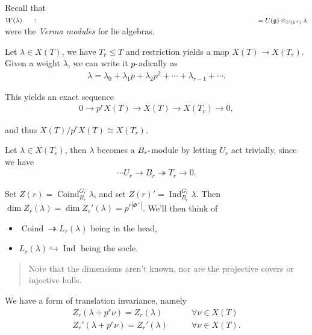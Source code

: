 Recall that
\(W(\lambda) \mathrel{\vcenter{:}}= U({\mathfrak{g}}) \otimes_{U({\mathfrak{b}}^+)} \lambda\)
were the \emph{Verma modules} for lie algebras.

Let \(\lambda \in X(T)\), we have \(T_r \leq T\) and restriction yields
a map \(X(T) \to X(T_r)\). Given a weight \(\lambda\), we can write it
\(p{\hbox{-}}\)adically as
\begin{align*}   \lambda = \lambda_0 + \lambda_1 p + \lambda_2 p^2 + \cdots + \lambda_{r-1} + \cdots .\end{align*}

This yields an exact sequence
\begin{align*}   0 \to p^r X(T) \to X(T) \to X(T_r) \to 0 ,\end{align*}

and thus \(X(T) / p^r X(T) \cong X(T_r)\).

Let \(\lambda \in X(T_r)\), then \(\lambda\) becomes a
\(B_r{\hbox{-}}\)module by letting \(U_r\) act trivially, since we have
\begin{align*}   \cdots U_r \to B_r \twoheadrightarrow T_r \to 0 .\end{align*}

Set \(Z(r) = \operatorname{Coind}_{B_r}^{G_r} \lambda\), and set
\(Z(r)' = \operatorname{Ind}_{B_r}^{G_r} \lambda\). Then
\(\dim Z_r(\lambda) = \dim Z_r'(\lambda) = p^{r{\left\lvert {\Phi^+} \right\rvert}}\).
We'll then think of

\begin{itemize}
\tightlist
\item
  \(\operatorname{Coind}\twoheadrightarrow L_r(\lambda)\) being in the
  head,
\item
  \(L_r(\lambda) \hookrightarrow\operatorname{Ind}\) being the socle.
\end{itemize}

\begin{quote}
Note that the dimensions aren't known, nor are the projective covers or
injective hulls.
\end{quote}

We have a form of translation invariance, namely
\begin{align*}   Z_r(\lambda + p^r\nu) = Z_r(\lambda) \qquad &\forall \nu \in X(T) \\ Z_r'(\lambda + p^r\nu) = Z_r'(\lambda) \qquad &\forall \nu \in X(T) .\end{align*}

